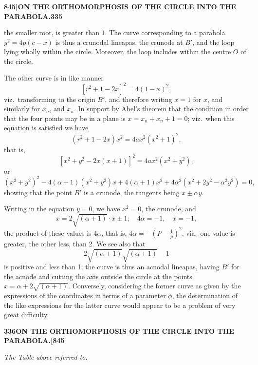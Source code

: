 \documentclass[12pt,a4paper]{article}
\theoremstyle{definition}
\begin{document}
\newpage
\setcounter{page}{335}

\noindent\textbf{845]}\hfill\textbf{ON THE ORTHOMORPHOSIS OF THE CIRCLE INTO THE PARABOLA.}\hfill\textbf{335}

\bigskip

\noindent the smaller root, is greater than $1$. The curve corresponding to a parabola $y^2 = 4p(c - x)$ is thus a crunodal lineapas, the crunode at $B'$, and the loop lying wholly within the circle. Moreover, the loop includes within the centre $O$ of the circle.

The other curve is in like manner
\[
[r^2 + 1 - 2x]^2 = 4(1 - x)^2,
\]
viz.\ transforming to the origin $B'$, and therefore writing $x = 1$ for $x$, and similarly for $x_n$, and $x_n$. In support by Abel's theorem that the condition in order that the four points may be in a plane is $x = x_n + x_n + 1 = 0$; viz.\ when this equation is satisfied we have
\[
(r^2 + 1 - 2x)x^2 = 4ax^2(x^2 + 1)^2,
\]
that is,
\[
[x^2 + y^2 - 2x(x + 1)]^2 = 4ax^2(x^2 + y^2),
\]
or
\[
(x^2 + y^2)^2 - 4(\alpha + 1)(x^2 + y^2)x + 4(\alpha + 1)x^2 + 4\alpha^2(x^2 + 2y^2 - \alpha^2y^2) = 0,
\]
showing that the point $B'$ is a crunode, the tangents being $x \pm \alpha y$.

Writing in the equation $y = 0$, we have $x^2 = 0$, the crunode, and
\[
x = 2\sqrt{(\alpha + 1)} \cdot x \pm 1; \quad 4\alpha = -1, \quad x = -1,
\]
the product of these values is $4\alpha$, that is, $4\alpha = -\left(P - \frac{1}{p}\right)^2$, via.\ one value is greater, the other less, than 2. We see also that
\[
2\sqrt{(\alpha + 1)}\sqrt{(\alpha + 1)} - 1
\]
is positive and less than 1; the curve is thus an acnodal lineapas, having $B'$ for the acnode and cutting the axis outside the circle at the points $x = \alpha + 2\sqrt{(\alpha + 1)}$. Conversely, considering the former curve as given by the expressions of the coordinates in terms of a parameter $\phi$, the determination of the like expressions for the latter curve would appear to be a problem of very great difficulty.

\newpage
\setcounter{page}{336}

\noindent\textbf{336}\hfill\textbf{ON THE ORTHOMORPHOSIS OF THE CIRCLE INTO THE PARABOLA.}\hfill\textbf{[845}

\bigskip

\begin{center}
\textit{The Table above referred to.}
\end{center}

\medskip
\end{document}
